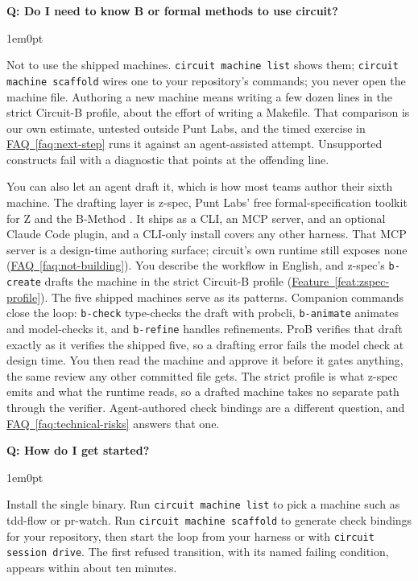 \documentclass[11pt,letterpaper]{article}
\newcounter{faqnum}
\newenvironment{faqpair}[1]{%
  \needspace{4\baselineskip}%
  \vspace{0.5em}%
  \refstepcounter{faqnum}%
  \noindent\textbf{\color{SectionBlue}Q\thefaqnum: #1}\par\nopagebreak[4]%
  \vspace{0.2em}%
  \begin{adjustwidth}{1em}{0pt}%
  \setlength{\parindent}{0pt}%
}{%
  \end{adjustwidth}%
  \vspace{0.5em}%
}
\newcommand{\faqref}[1]{\hyperref[#1]{FAQ~\ref*{#1}}}
\newcommand{\featureref}[1]{\hyperref[#1]{Feature~\ref*{#1}}}
\begin{document}
\begin{faqpair}{Do I need to know B or formal methods to use circuit?}
\label{faq:need-b}
  Not to use the shipped machines. \mbox{\texttt{circuit machine list}} shows them; \mbox{\texttt{circuit machine scaffold}} wires one to your repository's commands; you never open the machine file. Authoring a new machine means writing a few dozen lines in the strict Circuit-B profile, about the effort of writing a Makefile. That comparison is our own estimate, untested outside Punt Labs, and the timed exercise in \faqref{faq:next-step} runs it against an agent-assisted attempt. Unsupported constructs fail with a diagnostic that points at the offending line.

  You can also let an agent draft it, which is how most teams author their sixth machine. The drafting layer is z-spec, Punt Labs' free formal-specification toolkit for Z and the B-Method \cite{zspec2026}. It ships as a CLI, an MCP server, and an optional Claude Code plugin, and a CLI-only install covers any other harness. That MCP server is a design-time authoring surface; circuit's own runtime still exposes none (\faqref{faq:not-building}). You describe the workflow in English, and z-spec's \mbox{\texttt{b-create}} drafts the machine in the strict Circuit-B profile (\featureref{feat:zspec-profile}). The five shipped machines serve as its patterns. Companion commands close the loop: \mbox{\texttt{b-check}} type-checks the draft with probcli, \mbox{\texttt{b-animate}} animates and model-checks it, and \mbox{\texttt{b-refine}} handles refinements. ProB verifies that draft exactly as it verifies the shipped five, so a drafting error fails the model check at design time. You then read the machine and approve it before it gates anything, the same review any other committed file gets. The strict profile is what z-spec emits and what the runtime reads, so a drafted machine takes no separate path through the verifier. Agent-authored check bindings are a different question, and \faqref{faq:technical-risks} answers that one.
\end{faqpair}

\begin{faqpair}{How do I get started?}
\label{faq:getting-started}
  Install the single binary. Run \mbox{\texttt{circuit machine list}} to pick a machine such as tdd-flow or pr-watch. Run \mbox{\texttt{circuit machine scaffold}} to generate check bindings for your repository, then start the loop from your harness or with \mbox{\texttt{circuit session drive}}. The first refused transition, with its named failing condition, appears within about ten minutes.
\end{faqpair}
\end{document}
